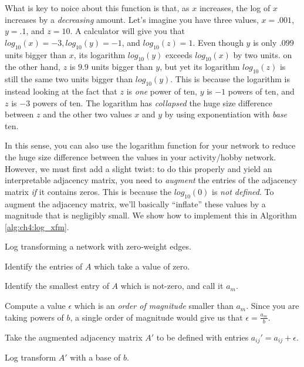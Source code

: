 What is key to noice about this function is that, as $x$ increases, the log of $x$ increases by a \emph{decreasing} amount. Let's imagine you have three values, $x = .001$, $y = .1$, and $z = 10$. A calculator will give you that $log_{10}(x) = -3, log_{10}(y) = -1$, and $log_{10}(z) = 1$. Even though $y$ is only $.099$ units bigger than $x$, its logarithm $log_{10}(y)$ exceeds $log_{10}(x)$ by two units. on the other hand, $z$ is $9.9$ units bigger than $y$, but yet its logarithm $log_{10}(z)$ is still the same two units bigger than $log_{10}(y)$. This is because the logarithm is instead looking at the fact that $z$ is \emph{one} power of ten, $y$ is $-1$ powers of ten, and $z$ is $-3$ powers of ten. The logarithm has \emph{collapsed} the huge size difference between $z$ and the other two values $x$ and $y$ by using exponentiation with \emph{base} ten. 


In this sense, you can also use the logarithm function for your network to reduce the huge size difference between the values in your activity/hobby network. However, we must first add a slight twist: to do this properly and yield an interpretable adjacency matrix, you need to \emph{augment} the entries of the adjacency matrix \emph{if} it contains zeros. This is because the $log_{10}(0)$ is \emph{not defined}. To augment the adjacency matrix, we'll basically ``inflate'' these values by a magnitude that is negligibly small. We show how to implement this in Algorithm \ref{alg:ch4:log_xfm}.

\begin{algorithm}[h]
    \SetAlgoLined
    \caption{Log transforming a network with zero-weight edges.}

    Identify the entries of $A$ which take a value of zero.

    Identify the smallest entry of $A$ which is not-zero, and call it $a_m$.

    Compute a value $\epsilon$ which is an \emph{order of magnitude} smaller than $a_m$. Since you are taking powers of $b$, a single order of magnitude would give us that $\epsilon = \frac{a_m}{b}$. 

    Take the augmented adjacency matrix $A'$ to be defined with entries $a_{ij}' = a_{ij} + \epsilon$.

    Log transform $A'$ with a base of $b$.
\end{algorithm}

